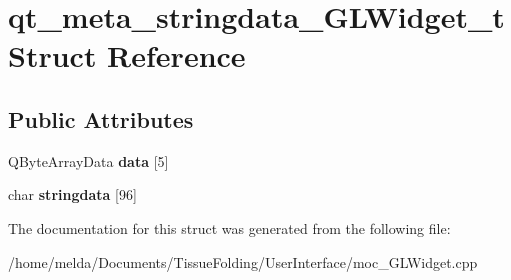\hypertarget{structqt__meta__stringdata__GLWidget__t}{}\section{qt\+\_\+meta\+\_\+stringdata\+\_\+\+G\+L\+Widget\+\_\+t Struct Reference}
\label{structqt__meta__stringdata__GLWidget__t}
\subsection*{Public Attributes}
\begin{DoxyCompactItemize}
\item 
\hypertarget{structqt__meta__stringdata__GLWidget__t_a141e1a16435859e83ba7c3f543b94165}{}Q\+Byte\+Array\+Data {\bfseries data} \mbox{[}5\mbox{]}\label{structqt__meta__stringdata__GLWidget__t_a141e1a16435859e83ba7c3f543b94165}

\item 
\hypertarget{structqt__meta__stringdata__GLWidget__t_a9f0e1317d4b3e7e5766c5a31b9f92e92}{}char {\bfseries stringdata} \mbox{[}96\mbox{]}\label{structqt__meta__stringdata__GLWidget__t_a9f0e1317d4b3e7e5766c5a31b9f92e92}

\end{DoxyCompactItemize}


The documentation for this struct was generated from the following file\+:\begin{DoxyCompactItemize}
\item 
/home/melda/\+Documents/\+Tissue\+Folding/\+User\+Interface/moc\+\_\+\+G\+L\+Widget.\+cpp\end{DoxyCompactItemize}
